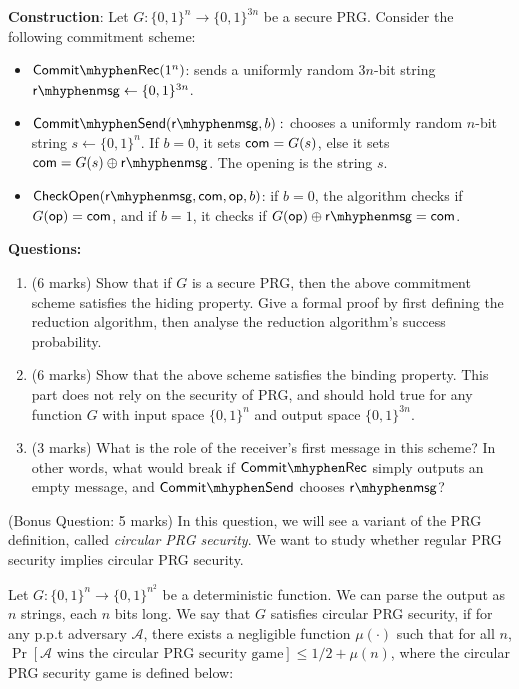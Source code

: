 \documentclass[10pt,addpoints]{exam}
\newcommand{\calA}{\mathcal{A}}
\newcommand{\prob}[1]{\Pr\left[ #1 \right]}
\begin{document}
\begin{questions}
    \textbf{Construction}: Let $G : \{0,1\}^n \to \{0,1\}^{3n}$ be a secure PRG. Consider the following commitment scheme:
    \begin{itemize}
         \item $\commitrec(1^n)$: sends a uniformly random $3n$-bit string $\rmsg \gets \{0,1\}^{3n}$.
         \item $\commitsend(\rmsg, b): $ chooses a uniformly random $n$-bit string $s \gets \{0,1\}^n$. If $b=0$, it sets $\mathsf{com} = G(s)$,  else it sets $\com = G(s) \oplus \rmsg$. The opening is the string $s$. 
         \item $\checkopen(\rmsg, \com, \op, b)$: if $b=0$, the algorithm checks if $G(\mathsf{op}) = \mathsf{com}$, and if $b=1$, it checks if $G(\op) \oplus \rmsg = \com$. 
    \end{itemize} 


    \vspace{20pt}
    \textbf{Questions:}
    \begin{enumerate}
        \item (6 marks) Show that if $G$ is a secure PRG, then the above commitment scheme satisfies the hiding property. Give a formal proof by first defining the reduction algorithm, then analyse the reduction algorithm's success probability. 
        
        \item (6 marks) Show that the above scheme satisfies the binding property. This part does not rely on the security of PRG, and should hold true for any function $G$ with input space $\{0,1\}^n$ and output space $\{0,1\}^{3n}$.
        
        \item (3 marks) What is the role of the receiver's first message in this scheme? In other words, what would break if $\commitrec$ simply outputs an empty message, and $\commitsend$ chooses $\rmsg$?
    \end{enumerate}

    \question (Bonus Question: 5 marks)
    In this question, we will see a variant of the PRG definition, called \emph{circular PRG security}. We want to study whether regular PRG security implies circular PRG security. 


    Let $G:\{0,1\}^n \to \{0,1\}^{n^2}$ be a deterministic function. We can parse the output as $n$ strings, each $n$ bits long. We say that $G$ satisfies circular PRG security, if for any p.p.t adversary $\calA$, there exists a negligible function $\mu(\cdot)$ such that for all $n$, $\prob{\calA \text{ wins the circular PRG security game}} \leq 1/2 + \mu(n)$, where the circular PRG security game is defined below: 
    

\end{questions}
\end{document}
